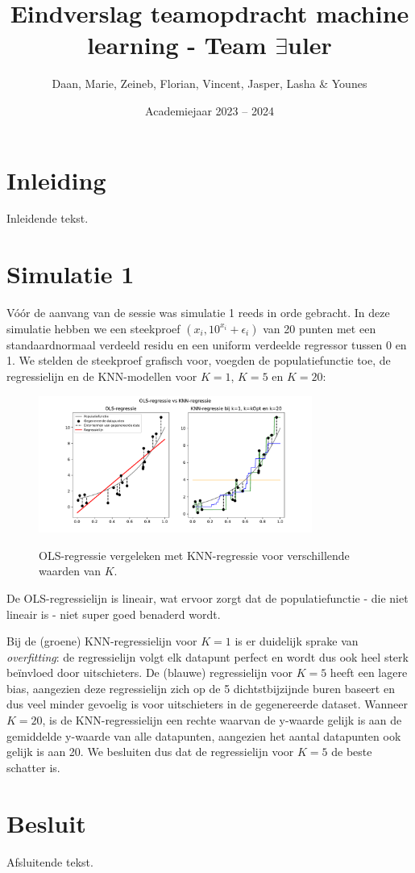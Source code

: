 \documentclass[kulak]{kulakarticle} %
\title{Eindverslag teamopdracht machine learning - Team $\exists$uler}
\author{\small Daan, Marie, Zeineb, Florian, Vincent, Jasper, Lasha \& Younes}
\date{Academiejaar 2023 -- 2024}
\begin{document}
\maketitle

\section*{Inleiding}

Inleidende tekst.

\section*{Simulatie 1}

Vóór de aanvang van de sessie was simulatie 1 reeds in orde gebracht.
In deze simulatie hebben we een steekproef \((x_i, 10^{x_i} + \epsilon_i)\) van 20 punten met een standaardnormaal verdeeld residu en een uniform verdeelde regressor tussen 0 en 1. We stelden de steekproef grafisch voor, voegden de populatiefunctie toe, de regressielijn en de KNN-modellen voor \(K=1\), \(K=5\) en \(K=20\):

\begin{figure}[h!]
	\centering
	\includegraphics[width=0.8\textwidth]{simulatie1}
	\label{fig:simulatie1}
	\caption{OLS-regressie vergeleken met KNN-regressie voor verschillende waarden van \(K\).}
\end{figure}

De OLS-regressielijn is lineair, wat ervoor zorgt dat de populatiefunctie - die niet lineair is - niet super goed benaderd wordt.

Bij de (groene) KNN-regressielijn voor \(K=1\) is er duidelijk sprake van \textit{overfitting}: de regressielijn volgt elk datapunt perfect en wordt dus ook heel sterk beïnvloed door uitschieters. De (blauwe) regressielijn voor \(K=5\) heeft een lagere bias, aangezien deze regressielijn zich op de 5 dichtstbijzijnde buren baseert en dus veel minder gevoelig is voor uitschieters in de gegenereerde dataset. Wanneer \(K=20\), is de KNN-regressielijn een rechte waarvan de y-waarde gelijk is aan de gemiddelde y-waarde van alle datapunten, aangezien het aantal datapunten ook gelijk is aan 20. We besluiten dus dat de regressielijn voor \(K=5\) de beste schatter is.

\section*{Besluit}

Afsluitende tekst.
\end{document}
